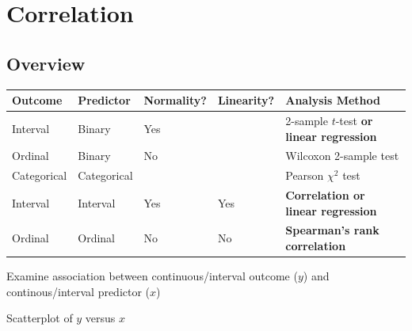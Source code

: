 
\chapter{Correlation}
\section{Overview}

\begin{center}
\smaller
\begin{tabular}{lllll} \hline
Outcome & Predictor & Normality? & Linearity? & Analysis Method \\ \hline
Interval & Binary & Yes & & 2-sample $t$-test \textbf{or linear regression} \\
Ordinal & Binary & No & & Wilcoxon 2-sample test \\
Categorical & Categorical & & & Pearson $\chi^2$ test \\
Interval & Interval & Yes & Yes & \textbf{Correlation or linear regression} \\ 
Ordinal & Ordinal & No & No & \textbf{Spearman's rank correlation} \\ \hline
\end{tabular}\end{center}

\bi 
\item Examine association between continuous/interval outcome ($y$) and continous/interval predictor ($x$)
\item Scatterplot of $y$ versus $x$
\ei

